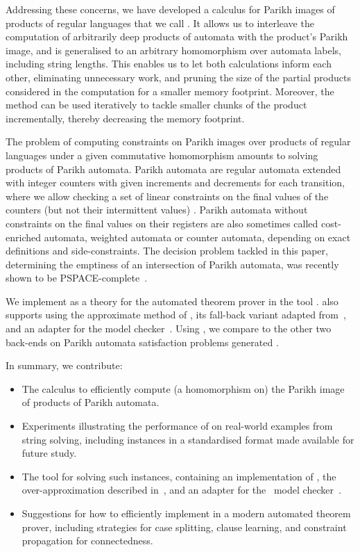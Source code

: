 \documentclass[acmsmall,review,anonymous,screen]{acmart}\settopmatter{printfolios=true,printccs=true,printacmref=true}
\theoremstyle{definition}
\begin{document}
Addressing these concerns, we have developed a calculus for Parikh images of
products of regular languages that we call \Calculus{}. It allows us to
interleave the computation of arbitrarily deep products of automata with the
product's Parikh image, and is generalised to an arbitrary homomorphism over
automata labels, including string lengths. This enables us to let both
calculations inform each other, eliminating unnecessary work, and pruning the
size of the partial products considered in the computation for a smaller memory
footprint. Moreover, the method can be used iteratively to tackle smaller chunks
of the product incrementally, thereby decreasing the memory footprint.

The problem of computing constraints on Parikh images over products of regular
languages under a given commutative homomorphism amounts to solving products of
Parikh automata. Parikh automata are regular automata extended with integer
counters with given increments and decrements for each transition, where we
allow checking a set of linear constraints on the final values of the counters
(but not their intermittent values) \cite{parikh-automata}. Parikh automata
without constraints on the final values on their registers are also sometimes
called cost-enriched automata, weighted automata or counter automata, depending
on exact definitions and side-constraints. The decision problem tackled in this
paper, determining the emptiness of an intersection of Parikh automata, was
recently shown to be PSPACE-complete~\cite{graph-queries}.

We implement \Calculus{} as a theory for the \Princess{} automated theorem
prover in the tool \Catra{}. \Catra also supports using the
approximate method of \cite{approximate-parikh}, its fall-back variant adapted
from~\cite{generate-parikh-image}, and an adapter for the \Nuxmv{} model
checker~\cite{nuxmv}. Using \Catra{}, we compare \Calculus{} to the other two
back-ends on \NrBenchmarks{} Parikh automata satisfaction problems generated
.

In summary, we contribute:
\begin{itemize}
\item The \Calculus{} calculus to efficiently compute (a homomorphism on) the
Parikh image of products of Parikh automata.
\item Experiments illustrating the performance of \Calculus{} on real-world examples from string solving, including \NrBenchmarks{} instances in a standardised format made available for future study.
\item The \Catra{} tool for solving such instances, containing an implementation of \Calculus{}, the over-approximation described in~\cite{approximate-parikh}, and an adapter for the~\Nuxmv{} model checker~\cite{nuxmv}.
\item Suggestions for how to efficiently implement \Calculus{} in a modern automated theorem prover, including strategies for case splitting, clause learning, and constraint propagation for connectedness.
\end{itemize}
\end{document}
